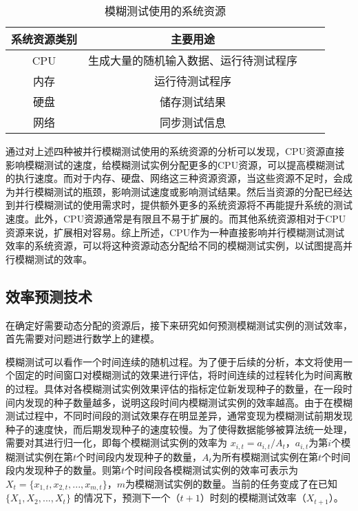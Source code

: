 \documentclass[master]{thesis-uestc}
\begin{document}
\begin{table}[!htbp]
    \caption{模糊测试使用的系统资源}
    \begin{tabular}{cccc}
    \toprule
    系统资源类别 & 主要用途 \\
    \midrule
    CPU & 生成大量的随机输入数据、运行待测试程序 \\
    内存 & 运行待测试程序 \\
    硬盘 & 储存测试结果 \\
    网络 & 同步测试信息 \\
    \bottomrule
    \end{tabular}
    \label{table_resource}
    \vspace{6pt}
\end{table}

通过对上述四种被并行模糊测试使用的系统资源的分析可以发现，CPU资源直接影响模糊测试的速度，给模糊测试实例分配更多的CPU资源，可以提高模糊测试的执行速度。而对于内存、硬盘、网络这三种资源资源，当这些资源不足时，会成为并行模糊测试的瓶颈，影响测试速度或影响测试结果。然后当资源的分配已经达到并行模糊测试的使用需求时，提供额外更多的系统资源将不再能提升系统的测试速度。此外，CPU资源通常是有限且不易于扩展的。而其他系统资源相对于CPU资源来说，扩展相对容易。综上所述，CPU作为一种直接影响并行模糊测试测试效率的系统资源，可以将这种资源动态分配给不同的模糊测试实例，以试图提高并行模糊测试的效率。


\subsection{效率预测技术}

在确定好需要动态分配的资源后，接下来研究如何预测模糊测试实例的测试效率，首先需要对问题进行数学上的建模。

模糊测试可以看作一个时间连续的随机过程。为了便于后续的分析，本文将使用一个固定的时间窗口对模糊测试的效果进行评估，将时间连续的过程转化为时间离散的过程。具体对各模糊测试实例效果评估的指标定位新发现种子的数量，在一段时间内发现的种子数量越多，说明这段时间内模糊测试实例的效率越高。由于在模糊测试过程中，不同时间段的测试效果存在明显差异，通常变现为模糊测试前期发现种子的速度快，而后期发现种子的速度较慢。为了使得数据能够被算法统一处理，需要对其进行归一化，即每个模糊测试实例的效率为 $x_{i, t} = a_{i,t} / A_t$，$a_{i,t}$为第$i$个模糊测试实例在第$t$个时间段内发现种子的数量，$A_t$为所有模糊测试实例在第$t$个时间段内发现种子的数量。则第$t$个时间段各模糊测试实例的效率可表示为$X_t = \{x_{1, t}, x_{2, t}, ..., x_{m, t}\}$，$m$为模糊测试实例的数量。当前的任务变成了在已知 $\{X_1, X_2, ..., X_t\}$ 的情况下，预测下一个（$t + 1$）时刻的模糊测试效率（$X_{t + 1}$）。
\end{document}

